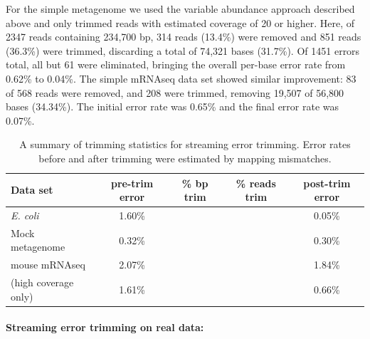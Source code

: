 \documentclass{article}
\begin{document}
For the simple metagenome we used the variable abundance approach
described above and only trimmed reads with estimated coverage of 20
or higher.  Here, of 2347 reads containing 234,700 bp, 314 reads
(13.4\%) were removed and 851 reads (36.3\%) were trimmed, discarding
a total of 74,321 bases (31.7\%).  Of 1451 errors total, all but 61
were eliminated, bringing the overall per-base error rate from 0.62\% to
0.04\%.  The simple mRNAseq data set showed similar improvement: 83 of
568 reads were removed, and 208 were trimmed, removing 19,507 of
56,800 bases (34.34\%).  The initial error rate was 0.65\% and the
final error rate was 0.07\%.

\begin{table}
\begin{tabular}{|l|c|c|c|c|}
\hline
Data set        & pre-trim error & \% bp trim & \% reads trim & post-trim error \\
\hline
{\em E. coli}   & 1.60\%         &                  &             & 0.05\% \\
Mock metagenome & 0.32\%         &                  &             & 0.30\% \\
mouse mRNAseq   & 2.07\%         &                  &             & 1.84\% \\
(high coverage only) & 1.61\%    &                  &             & 0.66\% \\

\hline
\end{tabular}

\caption{A summary of trimming statistics for streaming error trimming.
Error rates before and after trimming were estimated by mapping mismatches.}
\label{tab:trimming}
\end{table}

\paragraph{Streaming error trimming on real data:}



%
\end{document}
